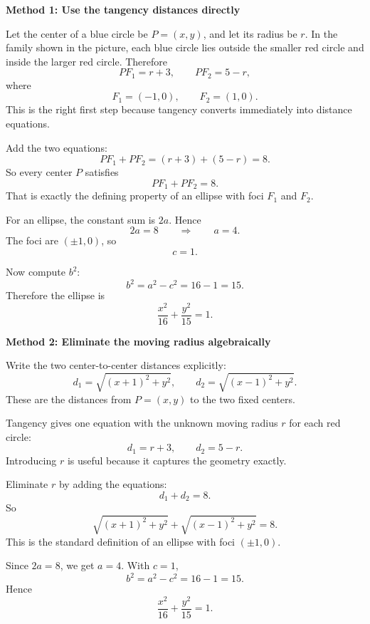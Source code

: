 \documentclass[a4paper,12pt,twocolumn]{article}
\newenvironment{solutionbox}{\begin{framed}}{\end{framed}}
\begin{document}
\begin{solutionbox}
\textbf{Method 1: Use the tangency distances directly}

\begin{steps}
\item Let the center of a blue circle be \(P=(x,y)\), and let its radius be \(r\). In the family shown in the picture, each blue circle lies outside the smaller red circle and inside the larger red circle. Therefore
\[
PF_1=r+3,
\qquad
PF_2=5-r,
\]
where
\[
F_1=(-1,0),\qquad F_2=(1,0).
\]
This is the right first step because tangency converts immediately into distance equations.

\item Add the two equations:
\[
PF_1+PF_2=(r+3)+(5-r)=8.
\]
So every center \(P\) satisfies
\[
PF_1+PF_2=8.
\]
That is exactly the defining property of an ellipse with foci \(F_1\) and \(F_2\).

\item For an ellipse, the constant sum is \(2a\). Hence
\[
2a=8 \qquad\Longrightarrow\qquad a=4.
\]
The foci are \((\pm1,0)\), so
\[
c=1.
\]

\item Now compute \(b^2\):
\[
b^2=a^2-c^2=16-1=15.
\]
Therefore the ellipse is
\[
\boxed{\frac{x^2}{16}+\frac{y^2}{15}=1.}
\]
\end{steps}
\end{solutionbox}

\begin{solutionbox}
\textbf{Method 2: Eliminate the moving radius algebraically}

\begin{steps}
\item Write the two center-to-center distances explicitly:
\[
d_1=\sqrt{(x+1)^2+y^2},
\qquad
d_2=\sqrt{(x-1)^2+y^2}.
\]
These are the distances from \(P=(x,y)\) to the two fixed centers.

\item Tangency gives one equation with the unknown moving radius \(r\) for each red circle:
\[
d_1=r+3,
\qquad
d_2=5-r.
\]
Introducing \(r\) is useful because it captures the geometry exactly.

\item Eliminate \(r\) by adding the equations:
\[
d_1+d_2=8.
\]
So
\[
\sqrt{(x+1)^2+y^2}+\sqrt{(x-1)^2+y^2}=8.
\]
This is the standard definition of an ellipse with foci \((\pm1,0)\).

\item Since \(2a=8\), we get \(a=4\). With \(c=1\),
\[
b^2=a^2-c^2=16-1=15.
\]
Hence
\[
\boxed{\frac{x^2}{16}+\frac{y^2}{15}=1.}
\]
\end{steps}
\end{solutionbox}
\end{document}
